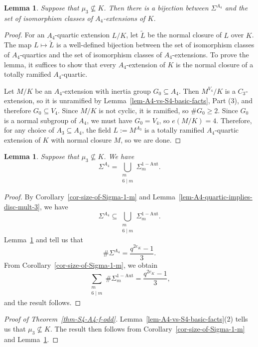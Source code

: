 \documentclass[11pt]{amsart}
\theoremstyle{theorem}
\newtheorem{lemma}[theorem]{Lemma}
\theoremstyle{example}
\theoremstyle{definition}
\numberwithin{theorem}{section}
\numberwithin{theorem}{section}
\newcommand{\oneaut}{\mathrm{1-Aut}}
\begin{document}
\begin{lemma}
    \label{lem-A4-exts-tot-ram}
    Suppose that $\mu_3 \not \subseteq K$. Then there is a bijection between $\Sigma^{A_4}$ and the set of isomorphism classes of $A_4$-extensions of $K$. 
\end{lemma}
\begin{proof}
    For an $A_4$-quartic extension $L/K$, let $\widetilde{L}$ be the normal closure of $L$ over $K$. The map $L \mapsto \widetilde{L}$ is a well-defined bijection between the set of isomorphism classes of $A_4$-quartics and the set of isomorphism classes of $A_4$-extensions. To prove the lemma, it suffices to show that every $A_4$-extension of $K$ is the normal closure of a totally ramified $A_4$-quartic. 

    Let $M/K$ be an $A_4$-extension with inertia group $G_0\subseteq A_4$. Then $M^{V_4}/K$ is a $C_3$-extension, so it is unramified by Lemma~\ref{lem-A4-vs-S4-basic-facts}, Part (3), and therefore $G_0 \subseteq V_4$. Since $M/K$ is not cyclic, it is ramified, so $\# G_0 \geq 2$. Since $G_0$ is a normal subgroup of $A_4$, we must have $G_0 = V_4$, so $e(M/K) = 4$. Therefore, for any choice of $A_3\subseteq A_4$, the field $L := M^{A_3}$ is a totally ramified $A_4$-quartic extension of $K$ with normal closure $M$, so we are done. 
\end{proof}
\begin{lemma}
    \label{lem-sigma-A4-in-terms-of-Sigma-1}
    Suppose that $\mu_3\not\subseteq K$. We have 
    $$
    \Sigma^{A_4} = \bigcup_{\substack{m \\ 6 \mid m}} \Sigma_m^{\oneaut}. 
    $$
\end{lemma}
\begin{proof}
    By Corollary~\ref{cor-size-of-Sigma-1-m} and Lemma~\ref{lem-A4-quartic-implies-disc-mult-3}, we have 
    $$
    \Sigma^{A_4} \subseteq \bigcup_{\substack{m \\ 6 \mid m}} \Sigma_m^{\oneaut}. 
    $$
    Lemma~\ref{lem-A4-exts-tot-ram} and \cite[Theorem~1.2]{wei-ji} tell us that 
    $$
    \#\Sigma^{A_4} = \frac{q^{2e_K} - 1}{3}. 
    $$
    From Corollary~\ref{cor-size-of-Sigma-1-m}, we obtain
    $$
    \sum_{\substack{m \\ 6\mid m}} \#\Sigma_m^{\oneaut} = \frac{q^{2e_K} - 1}{3},
    $$
    and the result follows. 
\end{proof}
\begin{proof}[Proof of Theorem~\ref{thm-S4-A4-f-odd}]
    Lemma~\ref{lem-A4-vs-S4-basic-facts}(2) tells us that $\mu_3 \not\subseteq K$. The result then follows from Corollary~\ref{cor-size-of-Sigma-1-m} and Lemma~\ref{lem-sigma-A4-in-terms-of-Sigma-1}.
\end{proof}
\end{document}
